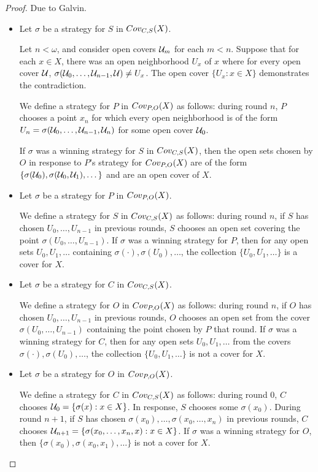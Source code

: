   \begin{proof}
    Due to Galvin.

    \begin{itemize}
      \item
      Let $\sigma$ be a strategy for $S$ in $Cov_{C,S}(X)$. 

      Let $n<\omega$, and consider open covers $\mathcal{U}_m$ for each $m<n$. Suppose that for each $x\in X$, there was an open neighborhood $U_x$ of $x$ where for every open cover $\mathcal{U}$, $\sigma(\mathcal{U}_0,\dots,\mathcal{U}_{n-1},\mathcal{U})\not=U_x$. The open cover $\{U_x : x\in X\}$ demonstrates the contradiction.

      We define a strategy for $P$ in $Cov_{P,O}(X)$ as follows: during round $n$, $P$ chooses a point $x_n$ for which every open neighborhood is of the form $U_n = \sigma(\mathcal{U}_0,\dots,\mathcal{U}_{n-1},\mathcal{U}_n)$ for some open cover $\mathcal{U}_0$.

      If $\sigma$ was a winning strategy for $S$ in $Cov_{C,S}(X)$, then the open sets chosen by $O$ in response to $P$'s strategy for $Cov_{P,O}(X)$ are of the form $\{\sigma(\mathcal{U}_0),\sigma(\mathcal{U}_0,\mathcal{U}_1),\dots\}$ and are an open cover of $X$.

      \item
      Let $\sigma$ be a strategy for $P$ in $Cov_{P,O}(X)$.

      We define a strategy for $S$ in $Cov_{C,S}(X)$ as follows: during round $n$, if $S$ has chosen $U_0,\dots,U_{n-1}$ in previous rounds, $S$ chooses an open set covering the point $\sigma(U_0,\dots,U_{n-1})$. If $\sigma$ was a winning strategy for $P$, then for any open sets $U_0,U_1,\dots$ containing $\sigma(\cdot),\sigma(U_0),\dots$, the collection $\{U_0,U_1,\dots\}$ is a cover for $X$.

      \item
      Let $\sigma$ be a strategy for $C$ in $Cov_{C,S}(X)$.

      We define a strategy for $O$ in $Cov_{P,O}(X)$ as follows: during round $n$, if $O$ has chosen $U_0,\dots,U_{n-1}$ in previous rounds, $O$ chooses an open set from the cover $\sigma(U_0,\dots,U_{n-1})$ containing the point chosen by $P$ that round. If $\sigma$ was a winning strategy for $C$, then for any open sets $U_0,U_1,\dots$ from the covers $\sigma(\cdot),\sigma(U_0),\dots$, the collection $\{U_0,U_1,\dots\}$ is not a cover for $X$.

      \item
      Let $\sigma$ be a strategy for $O$ in $Cov_{P,O}(X)$.

      We define a strategy for $C$ in $Cov_{C,S}(X)$ as follows: during round $0$, $C$ chooses $\mathcal{U}_0 = \{\sigma(x) : x\in X\}$. In response, $S$ chooses some $\sigma(x_0)$. During round $n+1$, if $S$ has chosen $\sigma(x_0),\dots,\sigma(x_0,\dots,x_n)$ in previous rounds, $C$ chooses $\mathcal{U}_{n+1} = \{\sigma(x_0,\dots,x_n,x) : x\in X\}$. If $\sigma$ was a winning strategy for $O$, then $\{\sigma(x_0),\sigma(x_0,x_1),\dots\}$ is not a cover for $X$.

    \end{itemize}
  \end{proof}

